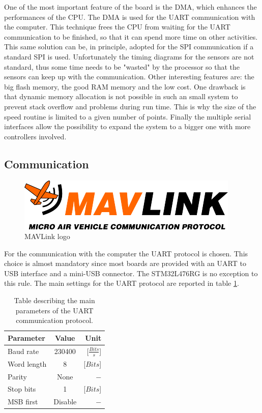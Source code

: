 \documentclass[12pt,a4paper, twoside]{article}
\begin{document}
One of the most important feature of the board is the DMA, which enhances the performances of the CPU. The DMA is used for the UART communication with the computer. This technique frees the CPU from waiting for the UART communication to be finished, so that it can spend more time on other activities. This same solution can be, in principle, adopted for the SPI communication if a standard SPI is used. Unfortunately the timing diagrams for the sensors are not standard, thus some time needs to be "wasted" by the processor so that the sensors can keep up with the communication.
Other interesting features are: the big flash memory, the good RAM memory and the low cost. One drawback is that dynamic memory allocation is not possible in such an small system to prevent stack overflow and problems during run time. This is why the size of the speed routine is limited to a given number of points.
Finally the multiple serial interfaces allow the possibility to expand the system to a bigger one with more controllers involved.

\subsection{Communication}

\begin{figure}
	\includegraphics[width=\linewidth]{fig/MAVLink_logo.png}
	\caption{MAVLink logo}\label{fig:MAVLink_logo}
\end{figure}
For the communication with the computer the UART protocol is chosen. This choice is almost mandatory since most boards are provided with an UART to USB interface and a mini-USB connector. The STM32L476RG is no exception to this rule. The main settings for the UART protocol are reported in table \ref{tab:UART}.

\begin{table}[H]
	\centering
	\begin{tabular}{l||c|r} 
		\textbf{Parameter} &\textbf{Value} &\textbf{Unit}\\ 
		\hline
		\hline 
		Baud rate & 230400 & [$\frac{Bits}{s}$] \\ 
		\hline 
		Word length & 8 & [$Bits$] \\ 
		\hline 
		Parity & None & $-$\\ 
		\hline 
		Stop bits & 1 & [$Bits$]\\ 
		\hline 
		MSB first & Disable & $-$  \\ 
	\end{tabular} 
	\caption{Table describing the main parameters of the UART communication protocol.}
	\label{tab:UART}
\end{table}
\end{document}
